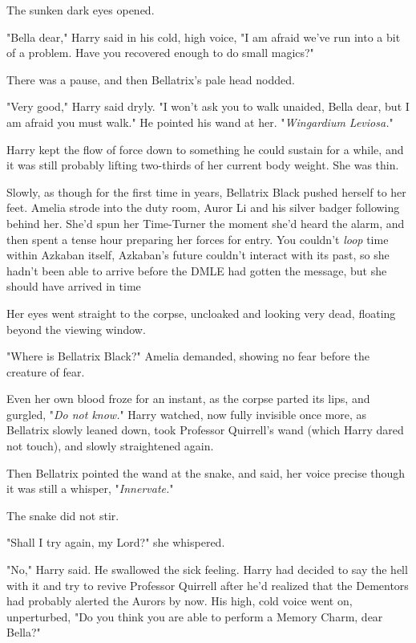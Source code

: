 The sunken dark eyes opened.

"Bella dear," Harry said in his cold, high voice, "I am afraid we've run into a
bit of a problem. Have you recovered enough to do small magics?"

There was a pause, and then Bellatrix's pale head nodded.

"Very good," Harry said dryly. "I won't ask you to walk unaided, Bella dear,
but I am afraid you must walk." He pointed his wand at her. "\emph{Wingardium
Leviosa.}"

Harry kept the flow of force down to something he could sustain for a while,
and it was still probably lifting two-thirds of her current body weight. She
was{\el} thin.

Slowly, as though for the first time in years, Bellatrix Black pushed herself
to her feet.
\sbreak
Amelia strode into the duty room, Auror Li and his silver badger following
behind her. She'd spun her Time-Turner the moment she'd heard the alarm, and
then spent a tense hour preparing her forces for entry. You couldn't
\emph{loop} time within Azkaban itself, Azkaban's future couldn't interact with
its past, so she hadn't been able to arrive before the DMLE had gotten the
message, but she should have arrived in time{\el}

Her eyes went straight to the corpse, uncloaked and looking very dead, floating
beyond the viewing window.

"Where is Bellatrix Black?" Amelia demanded, showing no fear before the
creature of fear.

Even her own blood froze for an instant, as the corpse parted its lips, and
gurgled, "\emph{Do not know.}"
\sbreak
Harry watched, now fully invisible once more, as Bellatrix slowly leaned down,
took Professor Quirrell's wand (which Harry dared not touch), and slowly
straightened again.

Then Bellatrix pointed the wand at the snake, and said, her voice precise
though it was still a whisper, "\emph{Innervate.}"

The snake did not stir.

"Shall I try again, my Lord?" she whispered.

"No," Harry said. He swallowed the sick feeling. Harry had decided to say the
hell with it and try to revive Professor Quirrell after he'd realized that the
Dementors had probably alerted the Aurors by now. His high, cold voice went on,
unperturbed, "Do you think you are able to perform a Memory Charm, dear Bella?"

